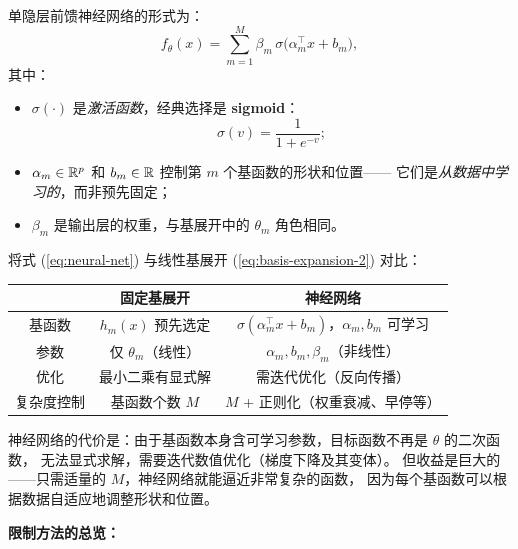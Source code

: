 单隐层前馈神经网络的形式为：
\begin{equation}\label{eq:neural-net}
    f_\theta(x) = \sum_{m=1}^{M} \beta_m \, \sigma\big(\alpha_m^\top x + b_m\big),
\end{equation}
其中：
\begin{itemize}
    \item $\sigma(\cdot)$ 是\emph{激活函数}，经典选择是 \textbf{sigmoid}：
    \begin{equation}
        \sigma(v) = \frac{1}{1 + e^{-v}};
    \end{equation}
    \item $\alpha_m \in \mathbb{R}^p$ 和 $b_m \in \mathbb{R}$ 控制第 $m$ 个基函数的形状和位置——
    它们是\emph{从数据中学习的}，而非预先固定；
    \item $\beta_m$ 是输出层的权重，与基展开中的 $\theta_m$ 角色相同。
\end{itemize}

将式 (\ref{eq:neural-net}) 与线性基展开 (\ref{eq:basis-expansion-2}) 对比：

\begin{center}
\renewcommand{\arraystretch}{1.5}
\begin{tabular}{c|c|c}
\toprule
& \textbf{固定基展开} & \textbf{神经网络} \\
\midrule
基函数 & $h_m(x)$ 预先选定 & $\sigma(\alpha_m^\top x + b_m)$，$\alpha_m, b_m$ 可学习 \\
参数 & 仅 $\theta_m$（线性） & $\alpha_m, b_m, \beta_m$（非线性） \\
优化 & 最小二乘有显式解 & 需迭代优化（反向传播） \\
复杂度控制 & 基函数个数 $M$ & $M$ + 正则化（权重衰减、早停等） \\
\bottomrule
\end{tabular}
\end{center}

神经网络的代价是：由于基函数本身含可学习参数，目标函数不再是 $\theta$ 的二次函数，
无法显式求解，需要迭代数值优化（梯度下降及其变体）。
但收益是巨大的——只需适量的 $M$，神经网络就能逼近非常复杂的函数，
因为每个基函数可以根据数据自适应地调整形状和位置。

\textbf{限制方法的总览：}

